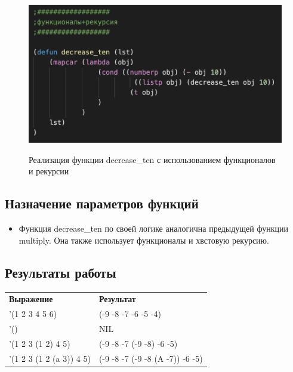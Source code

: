\documentclass[a4paper,12pt]{article}
\begin{document}
 	\begin{figure}[h!]
 		\begin{center}
 			{\includegraphics[scale = 1.0]{6.2.png}}
 			\label{ris:6.2}
 		\end{center}
 	\caption{Реализация функции decrease\_ten с использованием функционалов и рекурсии}
 	\end{figure}
 	
 	\subsection*{Назначение параметров функций}
 	
 	\begin{itemize}
 		\item Функция decrease\_ten по своей логике аналогична предыдущей функции multiply. Она также использует функционалы и хвстовую рекурсию.
 	\end{itemize}
 	
 	\subsection*{Результаты работы}
 	
 	\begin{table} [h!]
 		\begin{center}
 			\begin{tabular}{|l|l|}
 				\hline
 				{\bf  Выражение} & {\bf Результат} \\
 				{'(1 2 3 4 5 6)} & (-9 -8 -7 -6 -5 -4)\\
 				\hline
 				{'()} & NIL\\
 				\hline
 				{'(1 2 3 (1 2) 4 5)} & (-9 -8 -7 (-9 -8) -6 -5)\\
 				\hline 
 				{'(1 2 3 (1 2 (a 3)) 4 5)} & (-9 -8 -7 (-9 -8 (A -7)) -6 -5)\\
 			\end{tabular}  
 			\label{m2}
 		\end{center}
 	\end{table}
 	
\end{document}
